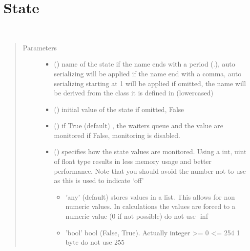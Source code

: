 \documentclass[letterpaper,10pt,english]{sphinxmanual}
\begin{document}
\section{State}
\label{\detokenize{Reference:state}}

\begin{fulllineitems}
\label{\detokenize{Reference:salabim.State}}~\begin{quote}\begin{description}
\item[{Parameters}] \leavevmode\begin{itemize}
\item {} 
 () \textendash{} name of the state 
if the name ends with a period (.),
auto serializing will be applied 
if the name end with a comma,
auto serializing starting at 1 will be applied 
if omitted, the name will be derived from the class
it is defined in (lowercased)

\item {} 
 (\sphinxstyleliteralemphasis{, }) \textendash{} initial value of the state 
if omitted, False

\item {} 
 () \textendash{} if True (default) , the waiters queue and the value are monitored 
if False, monitoring is disabled.

\item {} 
 () \textendash{} 
specifies how the state values are monitored. Using a
int, uint of float type results in less memory usage and better
performance. Note that you should avoid the number not to use
as this is used to indicate ‘off’
\begin{itemize}
\item {} 
’any’ (default) stores values in a list. This allows for
non numeric values. In calculations the values are
forced to a numeric value (0 if not possible) do not use -inf

\item {} 
’bool’ bool (False, True). Actually integer \textgreater{}= 0 \textless{}= 254 1 byte do not use 255


\end{itemize}
\end{itemize}
\end{description}
\end{quote}
\end{fulllineitems}
\end{document}
